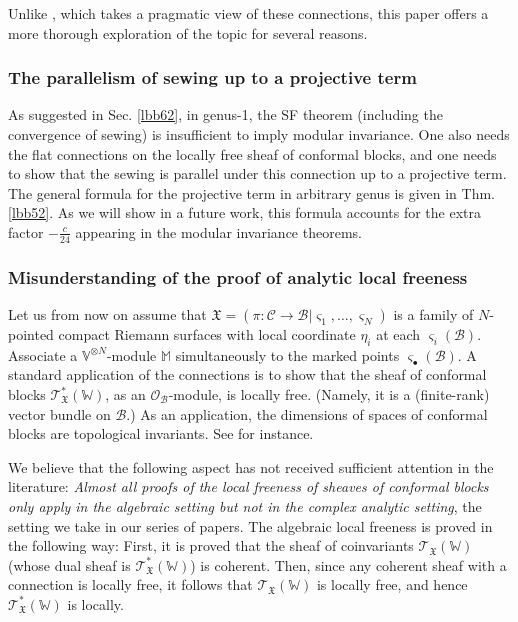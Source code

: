 \documentclass[11pt,b5paper,notitlepage]{article}
\theoremstyle{definition}
\theoremstyle{plain}
\newcommand{\scr}{\mathscr}
\newcommand{\sgm}{\varsigma}
\newcommand{\blt}{\bullet}
\newcommand{\Vbb}{\mathbb V}
\newcommand{\Wbb}{\mathbb W}
\newcommand{\Mbb}{\mathbb M}
\newcommand{\<}{\left\langle}
\renewcommand{\>}{\right\rangle}
\newcommand{\MO}{\mathcal{O}}
\newcommand{\MC}{\mathcal{C}}
\newcommand{\MB}{\mathcal{B}}
\newcommand{\fx}{\mathfrak{X}}
\numberwithin{equation}{subsection}
\begin{document}
Unlike \cite{Gui-sewingconvergence}, which takes a pragmatic view of these connections, this paper offers a more thorough exploration of the topic for several reasons.


\subsubsection*{The parallelism of sewing up to a projective term}

As suggested in Sec. \ref{lbb62}, in genus-1, the SF theorem (including the convergence of sewing) is insufficient to imply modular invariance. One also needs the flat connections on the locally free sheaf of conformal blocks, and one needs to show that the sewing is parallel under this connection up to a projective term. The general formula for the projective term in arbitrary genus is given in Thm. \ref{lbb52}. As we will show in a future work, this formula accounts for the extra factor $-\frac c{24}$ appearing in the modular invariance theorems.


\subsubsection*{Misunderstanding of the proof of analytic local freeness}

Let us from now on assume that $\fx=(\pi:\MC\rightarrow\MB|\sgm_1,\dots,\sgm_N)$ is a family of $N$-pointed compact Riemann surfaces with local coordinate $\eta_i$ at each $\sgm_i(\MB)$. Associate a $\Vbb^{\otimes N}$-module $\Mbb$ simultaneously to the marked points $\sgm_\blt(\MB)$. A standard application of the connections is to show that the sheaf of conformal blocks $\scr T^*_\fx(\Wbb)$, as an $\MO_\MB$-module, is locally free. (Namely, it is a (finite-rank) vector bundle on $\MB$.) As an application, the dimensions of spaces of conformal blocks are topological invariants. See \cite{TUY,Ueno97,Ueno08,NT-P1_conformal_blocks,DGT2} for instance. 


We believe that the following aspect has not received sufficient attention in the literature: \textit{Almost all proofs of the local freeness of sheaves of conformal blocks only apply in the algebraic setting but not in the complex analytic setting}, the setting we take in our series of papers. The algebraic local freeness is proved in the following way: First, it is proved that the sheaf of coinvariants $\scr T_\fx(\Wbb)$ (whose dual sheaf is $\scr T_\fx^*(\Wbb)$) is coherent. Then, since any coherent sheaf with a connection is locally free, it follows that $\scr T_\fx(\Wbb)$ is locally free, and hence $\scr T_\fx^*(\Wbb)$ is locally. 
\end{document}
